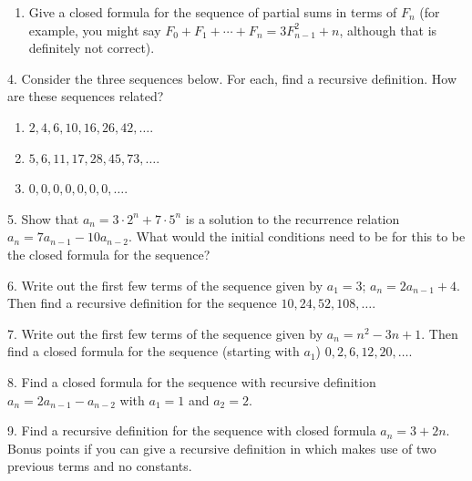 \documentclass[10pt,]{book}
\theoremstyle{plain}
\theoremstyle{definition}
\theoremstyle{definition}
\theoremstyle{definition}
\theoremstyle{definition}
\numberwithin{equation}{chapter}
\begin{document}
\begin{exerciselist}
\begin{enumerate}[label=(\alph*)]
\item\hypertarget{li-68}{}\hypertarget{p-93}{}%
Give a closed formula for the sequence of partial sums in terms of \(F_n\)\label{notation-3}
 (for example, you might say \(F_0 + F_1 + \cdots + F_n = 3F_{n-1}^2 + n\), although that is definitely not correct).%
\end{enumerate}
%
\par\smallskip
\item[4.]\hypertarget{exercise-4}{}\hypertarget{p-95}{}%
Consider the three sequences below. For each, find a recursive definition. How are these sequences related?%
\par
\hypertarget{p-96}{}%
\leavevmode%
\begin{enumerate}[label=(\alph*)]
\item\hypertarget{li-72}{}\(2, 4, 6, 10, 16, 26, 42, \ldots\).%
\item\hypertarget{li-73}{}\(5, 6, 11, 17, 28, 45, 73, \ldots\).%
\item\hypertarget{li-74}{}\(0, 0 , 0 , 0 , 0 , 0 , 0 ,\ldots\).%
\end{enumerate}
%
\par\smallskip
\item[5.]\hypertarget{exercise-5}{}\hypertarget{p-98}{}%
Show that \(a_n = 3\cdot 2^n + 7\cdot 5^n\) is a solution to the recurrence relation \(a_n = 7a_{n-1} - 10a_{n-2}\).   What would the initial conditions need to be for this to be the closed formula for the sequence?%
\par\smallskip
\item[6.]\hypertarget{exercise-6}{}\hypertarget{p-99}{}%
Write out the first few terms of the sequence given by \(a_1 = 3\); \(a_n = 2a_{n-1} + 4\). Then find a recursive definition for the sequence \(10, 24, 52, 108, \ldots\).%
\par\smallskip
\item[7.]\hypertarget{exercise-7}{}\hypertarget{p-100}{}%
Write out the first few terms of the sequence given by \(a_n = n^2 - 3n + 1\). Then find a closed formula for the sequence (starting with \(a_1\)) \(0, 2, 6, 12, 20, \ldots\).%
\par\smallskip
\item[8.]\hypertarget{exercise-8}{}\hypertarget{p-101}{}%
Find a closed formula for the sequence with recursive definition \(a_n = 2a_{n-1} - a_{n-2}\) with \(a_1 = 1\) and \(a_2 = 2\).%
\par\smallskip
\item[9.]\hypertarget{exercise-9}{}\hypertarget{p-102}{}%
Find a recursive definition for the sequence with closed formula \(a_n = 3 + 2n\). Bonus points if you can give a recursive definition in which makes use of two previous terms and no constants.%
\par\smallskip
\end{exerciselist}
\typeout{************************************************}
\typeout{************************************************}
\end{document}
